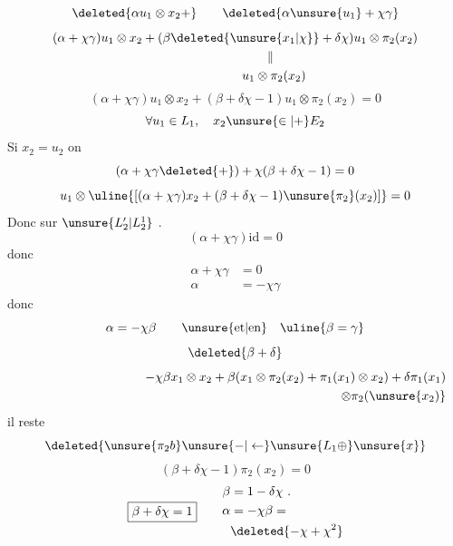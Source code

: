 \[
\deleted{\alpha u_1\otimes x_2+}\qquad
\deleted{\alpha\unsure{u_1}+\chi\gamma}
\]
\[
\begin{aligned}
&(\alpha+\chi\gamma)u_1\otimes x_2+(\beta\deleted{\unsure{x_1|\chi}}+\delta\chi)u_1\otimes\pi_2(x_2)\\
&\hspace{17em}\Vert\\
&\hspace{15em}u_1\otimes\pi_2(x_2)
\end{aligned}
\]
\[
(\alpha+\chi\gamma)u_1\otimes x_2+(\beta+\delta\chi-1)u_1\otimes\pi_2(x_2)=0
\]
\[
\forall u_1\in L_1,\quad x_2\unsure{\in|+}E_2
\]
Si \(x_2=u_2\) on 
\[
(\alpha+\chi\gamma\deleted{+})+\chi(\beta+\delta\chi-1)=0
\]
\[
u_1\otimes\uline{[(\alpha+\chi\gamma)x_2+(\beta+\delta\chi-1)\unsure{\pi_2}(x_2)]}=0
\]
Donc sur \(\unsure{L'_2|L_2^1}\) .
\[
(\alpha+\chi\gamma)\mathrm{id}=0
\]
donc
\[
\begin{aligned}
\alpha+\chi\gamma&=0\\
\alpha&=-\chi\gamma
\end{aligned}
\]
donc 
\[
\alpha=-\chi\beta\qquad\text{\unsure{et|en}}\quad\uline{\beta=\gamma}
\]
\[\deleted{\beta+\delta}\]
\[
\begin{aligned}
-\chi\beta x_1\otimes x_2+\beta(x_1\otimes\pi_2(x_2)+\pi_1(x_1)\otimes x_2)+\delta\pi_1(x_1)\\
\hspace{25em}\otimes\pi_2(\unsure{x_2)}
\end{aligned}
\]
il reste 
\[
\deleted{\unsure{\pi_2 b}\unsure{-|\leftarrow}\unsure{L_1\oplus}\unsure{x}}
\]
\[
(\beta+\delta\chi-1)\pi_2(x_2)=0
\]
\[
\boxed{\beta+\delta\chi=1}\qquad
\begin{aligned}
\beta&=1-\delta\chi\ .\\
\alpha&=-\chi\beta=\\
&\deleted{-\chi+\chi^2}
\end{aligned}
\]
